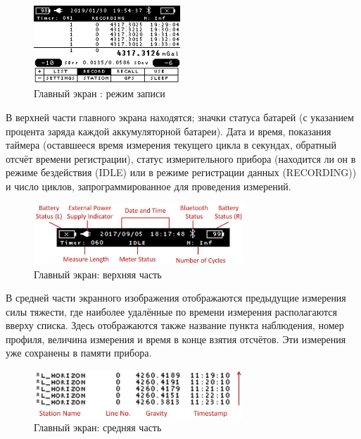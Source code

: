 \begin{figure}[h]
  \centering
  \includegraphics[width=0.49\textwidth]{figures/cg6_autograv_main_screen_recording_mode}
  \caption{Главный экран \cg{}: режим записи}
  \label{fig:cg6_autograv_main_screen_recording_mode}
\end{figure}

В верхней части главного экрана находятся; значки статуса батарей (с указанием
процента заряда каждой аккумуляторной батареи). Дата и время, показания таймера
(оставшееся время измерения текущего цикла в секундах, обратный отсчёт времени
регистрации), статус измерительного прибора (находится ли он в режиме
бездействия (IDLE) или в режиме регистрации данных (RECORDING)) и число циклов,
запрограммированное для проведения измерений.

\begin{figure}[h]
  \centering
  \includegraphics[width=0.7\textwidth]{figures/main_screen_upper_part}
  \caption{Главный экран: верхняя часть}
  \label{fig:main_screen_upper_part}
\end{figure}

В средней части экранного изображения отображаются предыдущие измерения силы
тяжести, где наиболее удалённые по времени измерения располагаются вверху
списка. Здесь отображаются также название пункта наблюдения, номер профиля,
величина измерения и время в конце взятия отсчётов. Эти измерения уже сохранены
в памяти прибора.

\begin{figure}[h]
  \centering
  \includegraphics[width=0.7\textwidth]{figures/main_screen_middle_part}
  \caption{Главный экран: средняя часть}
  \label{fig:main_screen_middle_part}
\end{figure}

